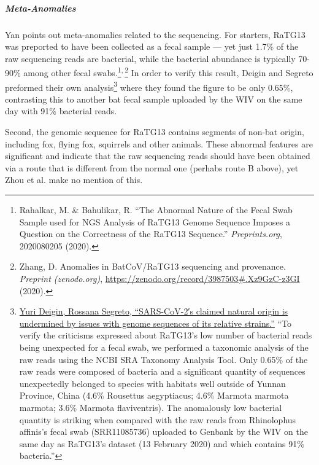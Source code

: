 \documentclass[11pt]{article}
\begin{document}
\subparagraph{Meta-Anomalies}
\label{sec:org17ad802}
Yan points out meta-anomalies related to the sequencing. For starters, RaTG13 was preported to have been collected as a fecal sample --- yet just 1.7\% of the raw sequencing reads are bacterial, while the bacterial abundance is typically 70-90\% among other fecal swabs.\footnote{Rahalkar, M. \& Bahulikar, R. ``The Abnormal Nature of the Fecal Swab Sample used for NGS Analysis of RaTG13 Genome Sequence Imposes a Question on the Correctness of the RaTG13 Sequence.'' \emph{Preprints.org}, 2020080205 (2020).}\textsuperscript{,}\,\footnote{Zhang, D. Anomalies in BatCoV/RaTG13 sequencing and provenance. \emph{Preprint (zenodo.org)}, \url{https://zenodo.org/record/3987503\#.Xz9GzC-z3GI} (2020).} In order to verify this result, Deigin and Segreto preformed their own analysis\footnote{\href{https://onlinelibrary.wiley.com/doi/pdfdirect/10.1002/bies.202100015}{Yuri Deigin, Rossana Segreto, ``SARS-CoV-2′s claimed natural origin is undermined by issues with genome sequences of its relative strains.''} ``To verify the criticisms expressed about RaTG13’s low number of bacterial reads being unexpected for a fecal swab, we performed a taxonomic analysis of the raw reads using the NCBI SRA Taxonomy Analysis Tool. Only 0.65\% of the raw reads were composed of bacteria and a significant quantity of sequences unexpectedly belonged to species with habitats well outside of Yunnan Province, China (4.6\% Rousettus aegyptiacus; 4.6\% Marmota marmota marmota; 3.6\% Marmota flaviventris). The anomalously low bacterial quantity is striking when compared with the raw reads from Rhinolophus affinis’s fecal swab (SRR11085736) uploaded to Genbank by the WIV on the same day as RaTG13’s dataset (13 February 2020) and which contains 91\% bacteria.''} where they found the figure to be only 0.65\%, contrasting this to another bat fecal sample uploaded by the WIV on the same day with 91\% bacterial reads.

Second, the genomic sequence for RaTG13 contains segments of non-bat origin, including fox, flying fox, squirrels and other animals. These abnormal features are significant and indicate that the raw  sequencing reads should have been obtained via a route that is different from the normal one (perhabs route B above), yet Zhou et al. make no mention of this.
\end{document}

